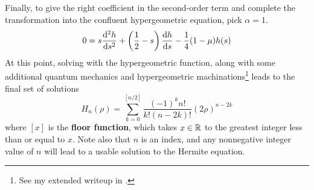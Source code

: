 \documentclass[titlepage]{article}
\numberwithin{equation}{section}
\begin{document}
Finally, to give the right coefficient in the second-order term and complete the transformation into the confluent hypergeometric equation, pick $\alpha=1$.
\begin{equation*}
    0 = s\dv[2]{h}{s}+\left( \frac{1}{2}-s \right)\dv{h}{s}-\frac{1}{4}(1-\mu)h(s)
\end{equation*}
At this point, solving with the hypergeometric function, along with some additional quantum mechanics and hypergeometric machinations\footnote{See my extended writeup in \textcite[23-25]{bib:FinalProject}.} leads to the final set of solutions
\begin{equation*}
    H_n(\rho) = \sum_{k=0}^{[n/2]}\frac{(-1)^kn!}{k!(n-2k)!}(2\rho)^{n-2k}
\end{equation*}
where $[x]$ is the \textbf{floor function}, which takes $x\in\mathbb{R}$ to the greatest integer less than or equal to $x$. Note also that $n$ is an index, and any nonnegative integer value of $n$ will lead to a usable solution to the Hermite equation.
\end{document}
